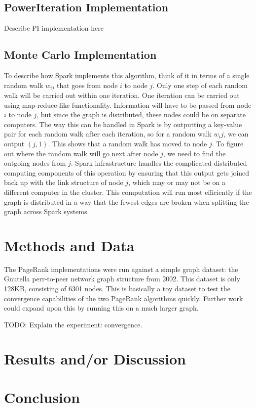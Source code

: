 \documentclass[letterpaper, 10 pt, conference]{ieeeconf}  %
\begin{document}
\subsection{PowerIteration Implementation}
Describe PI implementation here

\subsection{Monte Carlo Implementation}
To describe how Spark implements this algorithm, think of it in terms of a single random walk $w_{ij}$ that goes from node $i$ to node $j$. Only one step of each random walk will be carried out within one iteration. One iteration can be carried out using map-reduce-like functionality. Information will have to be passed from node $i$ to node $j$, but since the graph is distributed, these nodes could be on separate computers. The way this can be handled in Spark is by outputting a key-value pair for each random walk after each iteration, so for a random walk $w_ij$, we can output $(j, 1)$. This shows that a random walk has moved to node $j$. To figure out where the random walk will go next after node $j$, we need to find the outgoing nodes from $j$. Spark infrastructure handles the complicated distributed computing components of this operation by ensuring that this output gets joined back up with the link structure of node $j$, which may or may not be on a different computer in the cluster. This computation will run most efficiently if the graph is distributed in a way that the fewest edges are broken when splitting the graph across Spark systems.

\section{Methods and Data}
The PageRank implementations were run against a simple graph dataset: the Gnutella perr-to-peer network graph structure from 2002. This dataset is only 128KB, consisting of 6301 nodes. This is basically a toy dataset to test the convergence capabilities of the two PageRank algorithms quickly. Further work could expand upon this by running this on a much larger graph.

TODO: Explain the experiment: convergence.

\section{Results and/or Discussion}




\section{Conclusion}





\end{document}
